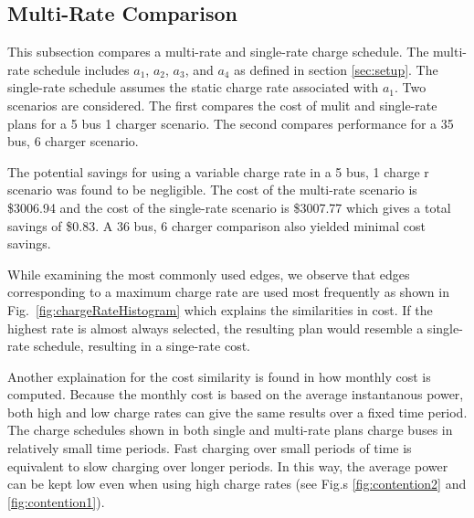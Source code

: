 \subsection{Multi-Rate Comparison}
This subsection compares a multi-rate and single-rate charge schedule. The multi-rate schedule includes $a_1$, $a_2$, $a_3$, and $a_4$ as defined in section \ref{sec:setup}.  The single-rate schedule assumes the static charge rate associated with $a_1$. Two scenarios are considered.  The first compares the cost of mulit and single-rate plans for a 5 bus 1 charger scenario. The second compares performance for a 35 bus, 6 charger scenario. 
\par The potential savings for using a variable charge rate in a 5 bus, 1 charge r scenario was found to be negligible.  The cost of the multi-rate scenario is \$3006.94 and the cost of the single-rate scenario is \$3007.77 which gives a total savings of \$0.83.
A 36 bus, 6 charger comparison also yielded minimal cost savings. 
\par While examining the most commonly used edges, we observe that edges corresponding to a maximum charge rate are used most frequently as shown in Fig.~\ref{fig:chargeRateHistogram} which explains the similarities in cost. If the highest rate is almost always selected, the resulting plan would resemble a single-rate schedule, resulting in a singe-rate cost.  
\par Another explaination for the cost similarity is found in how monthly cost is computed. Because the monthly cost is based on the average instantanous power, both high and low charge rates can give the same results over a fixed time period. The charge schedules shown in both single and multi-rate plans charge buses in relatively small time periods. Fast charging over small periods of time is equivalent to slow charging over longer periods. In this way, the average power can be kept low even when using high charge rates (see Fig.s \ref{fig:contention2} and \ref{fig:contention1}). 
